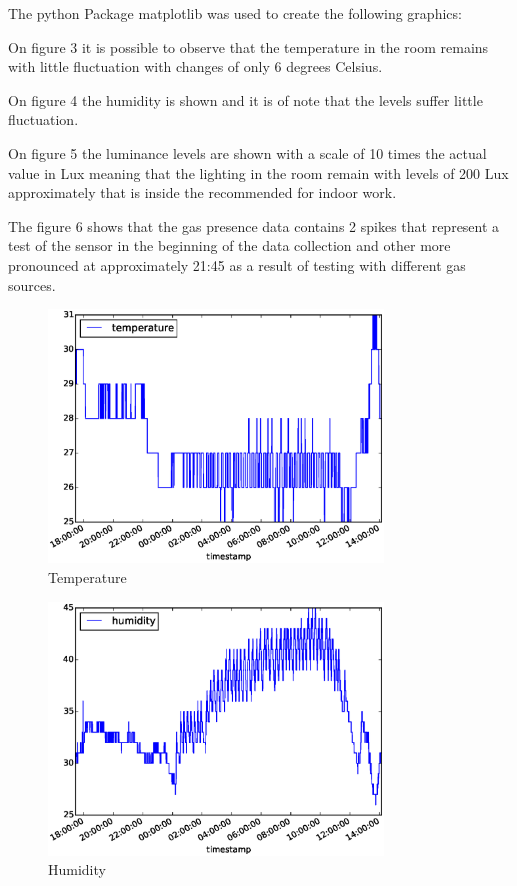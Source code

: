 \documentclass[letterpaper]{IEEEtran}
\begin{document}
The python Package matplotlib\cite{Hunter:2007} was used to create the following graphics:

On figure 3 it is possible to observe that the temperature in the room remains with little fluctuation with changes of only 6 degrees Celsius.

On figure 4 the humidity is shown and it is of note that the levels suffer little fluctuation.

On figure 5 the luminance levels are shown with a scale of 10 times the actual value in Lux meaning that the lighting in the room remain with levels of 200 Lux approximately that is inside the recommended for indoor work.

The figure 6 shows that the gas presence data contains 2 spikes that represent a test of the sensor in the beginning of the data collection and other more pronounced at approximately 21:45 as a result of testing with different gas sources.

\begin{figure}[ht!]
\centering
\includegraphics[width=3.5in]{plot_temperature}
\caption{Temperature}
\label{temp_plot}
\end{figure}

\begin{figure}[ht!]
\centering
\includegraphics[width=3.5in]{plot_humidity}
\caption{Humidity}
\label{humidity_plot}
\end{figure}
\end{document}
